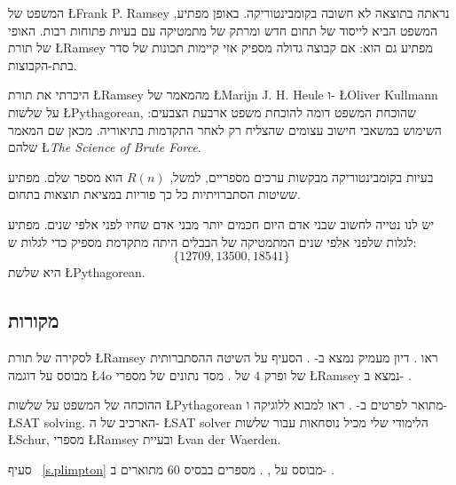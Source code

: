 המשפט של
\L{Frank P. Ramsey}
נראתה בתוצאה לא חשובה בקומבינטוריקה. באופן מפתיע, המשפט הביא לייסוד של תחום חדש ומרתק של מתמטיקה עם בעיות פתוחות רבות. האופי של תורת
\L{Ramsey}
מפתיע גם הוא: אם קבוצה גדולה מספיק אזי קיימות תכונות של סדר בתת-הקבוצות.

היכרתי את תורת 
\L{Ramsey}
מהמאמר של
\L{Marijn J. H. Heule}
ו-%
\L{Oliver Kullmann}
על שלשות
\L{Pythagorean},
שהוכחת המשפט דומה להוכחת משפט ארבעת הצבעים: השימוש במשאבי חישוב עצומים שהצליח רק לאחר התקדמות בתיאוריה. מכאן שם המאמר שלהם
\L{\textit{The Science of Brute Force}}.

בעיות בקומבינטוריקה מבקשות ערכים מספריים, למשל, 
$R(n)$
הוא מספר שלם. מפתיע ששיטות הסתברויתיות כל כך פוריות במציאת תוצאות בתחום.

יש לנו נטייה לחשוב שבני אדם היום חכמים יותר מבני אדם שחיו לפני אלפי שנים. מפתיע לגלות שלפני אלפי שנים המתמטיקה של הבבלים היתה מתקדמת מספיק כדי לגלות ש:
\[\{12709, 13500, 18541\}\]
היא שלשת
\L{Pythagorean}.

\subsection*{מקורות}

לסקירה של תורת
\L{Ramsey}
ראו
\cite{burton}.
דיון מעמיק נמצא ב-%
\cite{rudiments}.
הסעיף על השיטה ההסתברותית מבוסס על דוגמה
\L{4o}
של
\cite{ross}
ופרק
$4$
של
\cite{burton}.
מסד נתונים של מספרי
\L{Ramsey}
נמצא ב-%
\cite{mckay}.

ההוכחה של המשפט על שלשות
\L{Pythagorean}
מתואר לפרטים ב-%
\cite{brute}.
ראו 
\cite{mlcs}
למבוא ללוגיקה ו-%
\L{SAT solving}.
הארכיב של ה-%
\L{SAT solver}
הלימודי שלי 
\cite{joss}
מכיל נוסחאות עבור שלשות
\L{Schur}, 
מספרי
\L{Ramsey}
ובעיית
\L{van der Waerden}.

סעיף%
~\ref{s.plimpton}
מבוסס על
\cite{wiki:plimpton}, \cite{robson}. 
מספרים בבסיס
$60$
מתוארים ב-%
\cite{wiki:sexagesimal}.
